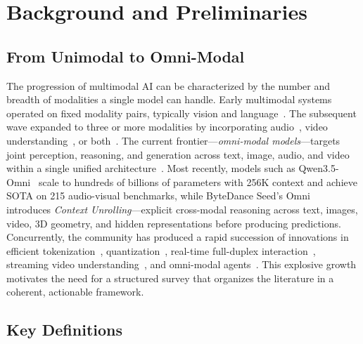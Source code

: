 \documentclass{article}
\begin{document}
\section{Background and Preliminaries}
\label{sec:background}

\subsection{From Unimodal to Omni-Modal}


The progression of multimodal AI can be characterized by the number and breadth of modalities a single model can handle.
Early multimodal systems operated on fixed modality pairs, typically vision and language~\cite{radford2021clip,li2023blip2,liu2024llava}.
The subsequent wave expanded to three or more modalities by incorporating audio~\cite{ghosal2023speechgpt,deshmukh2023pengi}, video understanding~\cite{lin2023videollava,zhang2023videochat}, or both~\cite{zhan2024anygpt,wu2024nextgpt,su2023pandagpt}.
The current frontier---\emph{omni-modal models}---targets joint perception, reasoning, and generation across text, image, audio, and video within a single unified architecture~\cite{openai2024gpt4o,google2024gemini,qwen2026omni,jiang2024chameleon,seed2026omni}.
Most recently, models such as Qwen3.5-Omni~\cite{qwen2026omni} scale to hundreds of billions of parameters with 256K context and achieve SOTA on 215 audio-visual benchmarks, while ByteDance Seed's Omni~\cite{seed2026omni} introduces \emph{Context Unrolling}---explicit cross-modal reasoning across text, images, video, 3D geometry, and hidden representations before producing predictions.
Concurrently, the community has produced a rapid succession of innovations in efficient tokenization~\cite{placeholder2026latentomni,placeholder2026omnidrop}, quantization~\cite{placeholder2025morphoquant}, real-time full-duplex interaction~\cite{placeholder2026duplexomni}, streaming video understanding~\cite{placeholder2026streamov}, and omni-modal agents~\cite{placeholder2026oscar,placeholder2026sandboxagent,nvidia2026cosmos3}. This explosive growth motivates the need for a structured survey that organizes the literature in a coherent, actionable framework.

\subsection{Key Definitions}
\end{document}
